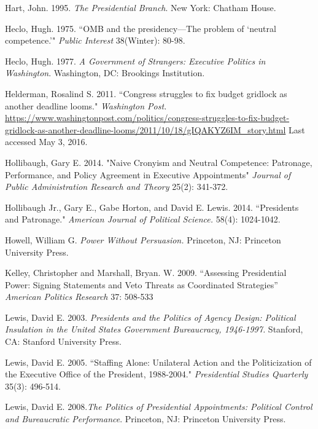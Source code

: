 \documentclass[12pt]{article}
\begin{document}
\noindent \hangindent=0.7cm Hart, John. 1995. \textit{The Presidential Branch}.  New York: Chatham House.

\noindent \hangindent=0.7cm Heclo, Hugh. 1975. ``OMB and the presidency---The problem of `neutral competence.'" \textit{Public Interest} 38(Winter): 80-98.

\noindent \hangindent=0.7cm Heclo, Hugh. 1977. \textit{A Government of Strangers: Executive Politics in Washington}. Washington, DC: Brookings Institution.

\noindent \hangindent=0.7cm Helderman, Rosalind S. 2011. ``Congress struggles to fix budget gridlock as another deadline looms." \textit{Washington Post.} \url{https://www.washingtonpost.com/politics/congress-struggles-to-fix-budget-gridlock-as-another-deadline-looms/2011/10/18/gIQAKYZ6IM_story.html} Last accessed May 3, 2016. 

\noindent \hangindent=0.7cm Hollibaugh, Gary E. 2014. "Naive Cronyism and Neutral Competence: Patronage, Performance, and Policy Agreement in Executive Appointments" \textit{Journal of Public Administration Research and Theory} 25(2): 341-372. 

\noindent \hangindent=0.7cm Hollibaugh Jr., Gary E., Gabe Horton, and David E. Lewis. 2014. ``Presidents and Patronage." \textit{American Journal of Political Science.} 58(4): 1024-1042.

\noindent \hangindent=0.7cm Howell, William G. \textit{Power Without Persuasion.} Princeton, NJ: Princeton University Press.

\noindent \hangindent=0.7cm Kelley, Christopher and Marshall, Bryan. W. 2009. ``Assessing Presidential Power: Signing Statements and Veto Threats as Coordinated Strategies'' \textit{American Politics Research} 37: 508-533

\noindent \hangindent=0.7cm Lewis, David E. 2003. \textit{Presidents and the Politics of Agency Design: Political Insulation in the United States Government Bureaucracy, 1946-1997.} Stanford, CA: Stanford University Press.

\noindent \hangindent=0.7cm Lewis, David E. 2005. ``Staffing Alone: Unilateral Action and the Politicization of the Executive Office of the President, 1988-2004." \textit{Presidential Studies Quarterly} 35(3): 496-514.

\noindent \hangindent=0.7cm Lewis, David E. 2008.\textit{The Politics of Presidential Appointments: Political Control and Bureaucratic Performance}. Princeton, NJ: Princeton University Press. 
\end{document}
